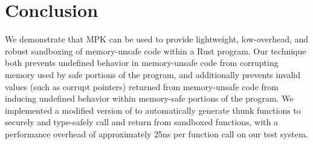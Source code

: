 \chapter{Conclusion}

We demonstrate that MPK can be used to provide lightweight, low-overhead, and robust sandboxing of
memory-unsafe code within a Rust program. Our technique both prevents undefined behavior in
memory-unsafe code from corrupting memory used by safe portions of the program, and additionally
prevents invalid values (such as corrupt pointers) returned from memory-unsafe code from inducing
undefined behavior within memory-safe portions of the program. We implemented a modified version of
 to automatically generate thunk functions to securely and type-safely call and return
from sandboxed functions, with a performance overhead of approximately 25ns per function call
on our test system.
